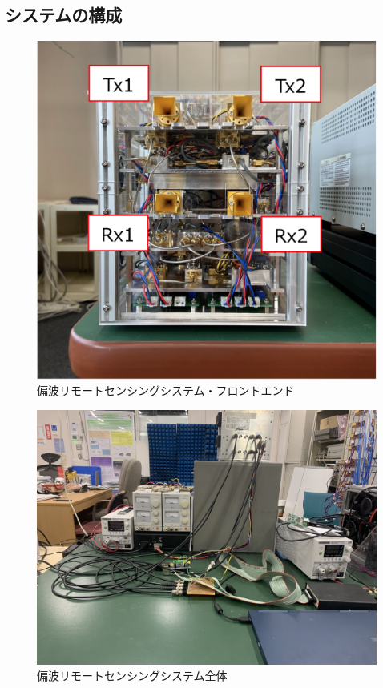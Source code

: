\documentclass[uplatex,a4paper]{jsarticle}
\begin{document}
\subsection{システムの構成}
\begin{figure}[hbtp]
	\centering
	\includegraphics[scale=0.3]{../img/system.png}
    \caption{偏波リモートセンシングシステム・フロントエンド}
	\label{fig:system}
\end{figure}
\begin{figure}[hbtp]
	\centering
	\includegraphics[scale=0.1]{../img/system_all.jpeg}
    \caption{偏波リモートセンシングシステム全体}
	\label{fig:system_all}
\end{figure}
\end{document}
